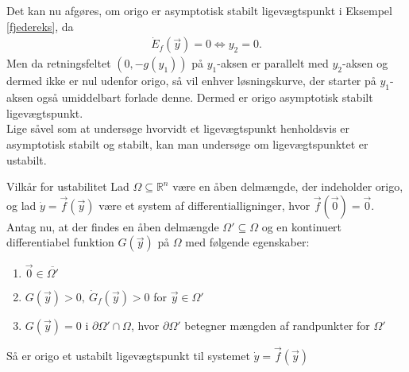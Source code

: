 \hfill \break
Det kan nu afgøres, om origo er asymptotisk stabilt ligevægtspunkt i Eksempel \ref{fjedereks}, 
da 
\begin{align*}
    \dot{E}_f(\vec{y})=0 \Leftrightarrow y_2=0.
\end{align*}
Men da retningsfeltet $(0,-g(y_1))$ på $y_1$-aksen er parallelt med $y_2$-aksen og dermed ikke er nul udenfor origo, så vil enhver løsningskurve, der starter på $y_1$-aksen også umiddelbart forlade denne. Dermed er origo asymptotisk stabilt ligevægtspunkt.\\
\hfill \break
Lige såvel som at undersøge hvorvidt et ligevægtspunkt henholdsvis er asymptotisk stabilt og stabilt, kan man undersøge om ligevægtspunktet er ustabilt.
\begin{mytheo}{Vilkår for ustabilitet}{}
Lad $\Omega\subseteq \mathbb{R}^n$ være en åben delmængde, der indeholder origo, og lad $\dot{y}=\vec{f}(\vec{y})$ være et system af differentialligninger, hvor $\vec{f}(\vec{0})=\vec{0}$. Antag nu, at der findes en åben delmængde $\Omega'\subseteq\Omega$ og en kontinuert differentiabel funktion $G(\vec{y})$ på $\Omega$ med følgende egenskaber:
\begin{enumerate}
  \item $\vec{0} \in \overline{\Omega'}$ \\
  \item $G(\vec{y})>0, \ \dot{G}_f(\vec{y})>0$ for $\vec{y}\in \Omega'$\\
  \item $G(\vec{y})=0$ i $\partial \Omega ' \cap \Omega$, hvor $\partial \Omega'$ betegner mængden af randpunkter for $\Omega'$ \\
\end{enumerate}
Så er origo et ustabilt ligevægtspunkt til systemet $\dot{y}=\vec{f}(\vec{y})$
\end{mytheo}
